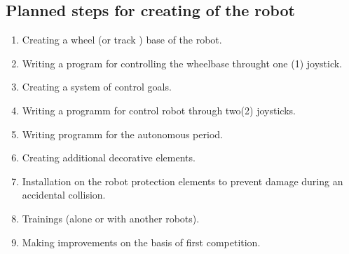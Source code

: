\subsection{Planned steps for creating of the robot}
\begin{enumerate}
	\item Creating a wheel (or track ) base of the robot.
	\item Writing a program for controlling the wheelbase throught one (1) joystick.
	\item Creating a system of control goals.
	\item Writing a programm for control robot through two(2) joysticks.
	\item Writing programm for the autonomous period.
	\item Creating additional decorative elements.
	\item Installation on the robot protection elements to prevent damage during an accidental collision.
	\item Trainings (alone or with another robots).
	\item Making improvements on the basis of first competition.
\end{enumerate}
\fillpage
